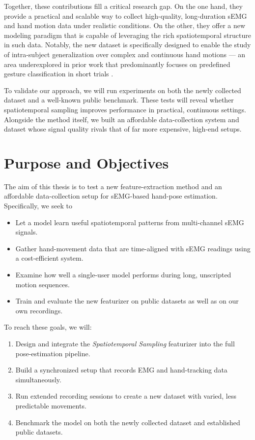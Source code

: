 Together, these contributions fill a critical research gap. On the one hand, they provide a practical and scalable way to collect high-quality, long-duration sEMG and hand motion data under realistic conditions. On the other, they offer a new modeling paradigm that is capable of leveraging the rich spatiotemporal structure in such data. Notably, the new dataset is specifically designed to enable the study of intra-subject generalization over complex and continuous hand motions — an area underexplored in prior work that predominantly focuses on predefined gesture classification in short trials \cite{salter2024emg2pose}.

To validate our approach, we will run experiments on both the newly collected dataset and a well-known public benchmark. These tests will reveal whether spatiotemporal sampling improves performance in practical, continuous settings. Alongside the method itself, we built an affordable data-collection system and dataset whose signal quality rivals that of far more expensive, high-end setups.

\section{Purpose and Objectives}

The aim of this thesis is to test a new feature-extraction method and an affordable data-collection setup for sEMG-based hand-pose estimation. Specifically, we seek to
\begin{itemize}
    \item Let a model learn useful spatiotemporal patterns from multi-channel sEMG signals.
    \item Gather hand-movement data that are time-aligned with sEMG readings using a cost-efficient system.
    \item Examine how well a single-user model performs during long, unscripted motion sequences.
    \item Train and evaluate the new featurizer on public datasets as well as on our own recordings.
\end{itemize}

To reach these goals, we will:
\begin{enumerate}
    \item Design and integrate the \emph{Spatiotemporal Sampling} featurizer into the full pose-estimation pipeline.
    \item Build a synchronized setup that records EMG and hand-tracking data simultaneously.
    \item Run extended recording sessions to create a new dataset with varied, less predictable movements.
    \item Benchmark the model on both the newly collected dataset and established public datasets.
\end{enumerate}


